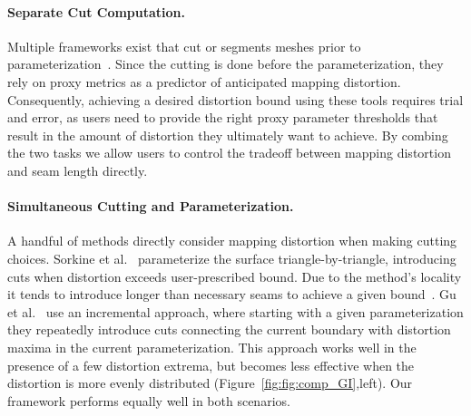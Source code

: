 \paragraph{Separate Cut Computation.}
Multiple frameworks exist that cut or segments meshes prior to parameterization~\cite{Sheffer2002Seamster,Julius2005D,Snyder2003Multi,Levy2002,needMore}.
Since the cutting is done before the parameterization, they rely on proxy metrics as a predictor of anticipated mapping distortion. Consequently, achieving a desired distortion bound using these tools requires trial and error, as users need to provide the right proxy parameter thresholds that result in the amount of distortion they ultimately want to achieve. By combing the two tasks we allow users to control the tradeoff between mapping distortion and seam length directly. 

\paragraph{Simultaneous Cutting and Parameterization.}
A handful of methods directly consider mapping distortion when making cutting choices. 
Sorkine et al.~ parameterize the surface triangle-by-triangle, introducing cuts when distortion exceeds user-prescribed bound. Due to the method's locality it tends to introduce longer than necessary seams to achieve a given bound~\cite{Hormann2008,Poranne2017Autocuts}. 
Gu et al.~ use an incremental approach, where starting with a given parameterization they  repeatedly introduce cuts connecting the current boundary with distortion maxima in the current parameterization.  This approach works well in the presence of a few distortion extrema, but becomes less effective when the distortion is more evenly distributed (Figure~\ref{fig:fig:comp_GI},left). Our framework performs equally well in both scenarios.  


